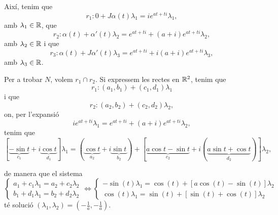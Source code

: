 \documentclass[a4paper, 11pt]{article}
\begin{document}
\begin{solution}
\begin{center}
    \end{center}
    
    Així, tenim que
    \[
      r_1: 0 + J \alpha(t)\lambda_1 = i e^{at + ti} \lambda_1,
    \]
    amb $\lambda_1 \in \mathbb{R}$, que
    \[
      r_2: \alpha(t) + \alpha'(t) \lambda_2 =
      e^{at + ti} + (a + i)e^{at + ti} \lambda_2,
    \]
    amb $\lambda_2 \in \mathbb{R}$ i que
    \[
      r_3: \alpha(t) + J \alpha'(t) \lambda_3 =
      e^{at + ti} + i(a + i)e^{at + ti} \lambda_3,
    \]
    amb $\lambda_3 \in \mathbb{R}$.

    Per a trobar $N$, volem $r_1 \cap r_2$. Si expressem les rectes en 
    $\mathbb{R}^2$, tenim que
    \[
      r_1: (a_1, b_1) + (c_1, d_1) \lambda_1
    \]
    i que
    \[
      r_2: (a_2, b_2) + (c_2, d_2) \lambda_2,
    \]
    on, per l'expansió
    \[
      i e^{at + ti} \lambda_1 
      = e^{at + ti} + (a + i)e^{at + ti} \lambda_2,
    \]
    tenim que
    \[
      [\underbrace{-\sin t}_{c_1}
      + i\underbrace{\cos t}_{d_1}
      ] \lambda_1
      = (\underbrace{\cos t}_{a_2}
      + i\underbrace{\sin t}_{b_2})
      + [\underbrace{a\cos t - \sin t}_{c_2}
      + i (\underbrace{a\sin t + \cos t}_{d_2})
      ] \lambda_2,
    \]

    de manera que el sistema
    \[
      \begin{cases}
        a_1 + c_1 \lambda_1 = a_2 + c_2 \lambda_2 \\
        b_1 + d_1 \lambda_1 = b_2 + d_2 \lambda_2
      \end{cases}
      \iff
      \begin{cases}
        -\sin (t) \lambda_1 = \cos (t) +
        \left[a\cos (t) - \sin (t)\right] \lambda_2 \\
        \cos (t) \lambda_1 = \sin (t) +
        \left[\sin (t) + \cos (t)\right] \lambda_2
      \end{cases}
    \]
    té solució $(\lambda_1, \lambda_2) = (-\frac{1}{a}, -\frac{1}{a})$.


\end{solution}
\end{document}
